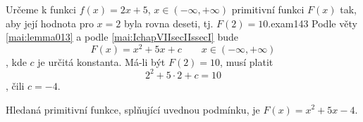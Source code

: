 \begin{mathexam}{Určeme k funkci \(f(x)=2x+5\), \(x\in(-\infty, +\infty)\) primitivní funkci
  \(F(x)\) tak, aby její hodnota pro \(x=2\) byla rovna deseti, tj. \(F(2)=10\).}{exam143}
  Podle věty \eqref{mai:lemma013} a podle \eqref{mai:IchapVIIsecIIssecI} bude \[F(x)=x^2 + 5x +
  c\qquad x\in(-\infty, +\infty)\], kde \(c\) je určitá konstanta. Má-li být \(F(2) = 10\), musí
  platit \[2^2+5\cdot2 + c = 10\], čili \(c=-4\). 

    Hledaná primitivní funkce, splňující uvednou podmínku, je \(F(x)=x^2 + 5x -4\).
\end{mathexam}